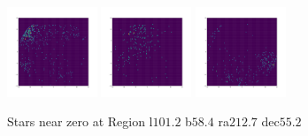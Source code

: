 \documentclass[12pt,prd]{article}
\begin{document}
\begin{figure}[h!]
\includegraphics[width=0.24\textwidth]{../figures/stars_near_zero_2dhistgaiascan_l101_2_b58_4_ra212_7_dec55_2_npy_15.pdf}
\includegraphics[width=0.24\textwidth]{../figures/stars_near_zero_2dhistgaiascan_l101_2_b58_4_ra212_7_dec55_2_npy_16.pdf}
\includegraphics[width=0.24\textwidth]{../figures/stars_near_zero_2dhistgaiascan_l101_2_b58_4_ra212_7_dec55_2_npy_17.pdf}
\caption{Stars near zero at Region l$101.2$ b$58.4$ ra$212.7$ dec$55.2$}
\end{figure}
\end{document}
